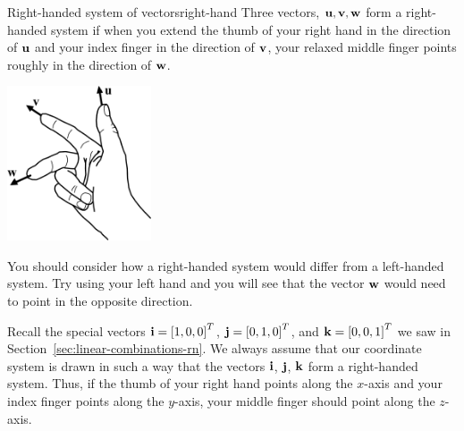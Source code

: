 \begin{definition}{Right-handed system of vectors}{right-hand}
  Three vectors, $\mbox{\bf u},\mbox{\bf v},\mbox{\bf w}$ form a right-handed
  system if when you extend the thumb of your right hand in the
  direction of $\mbox{\bf u}$ and your index finger in the direction of
  $\mbox{\bf v}$, your relaxed middle finger points roughly in the
  direction of $\mbox{\bf w}$.
  \begin{center}
    \hspace{1in}
    \includegraphics[height=1.8in]{figures/right-handed}
  \end{center}
\end{definition}

You should consider how a right-handed system would differ from a
left-handed system. Try using your left hand and you will see that the
vector $\mbox{\bf w}$ would need to point in the opposite direction.

Recall the special vectors $\mbox{\bf i}=\left[1,0,0\right]^T$,
$\mbox{\bf j}=\left[0,1,0\right]^T$, and $\mbox{\bf k}=\left[0,0,1\right]^T$ we saw in
Section~\ref{sec:linear-combinations-rn}. We always assume that our
coordinate system is drawn in such a way that the vectors $\mbox{\bf i}$,
$\mbox{\bf j}$, $\mbox{\bf k}$ form a right-handed system. Thus, if the thumb
of your right hand points along the $x$-axis and your index finger
points along the $y$-axis, your middle finger should point along the
$z$-axis.

\begin{center}
\end{center}


